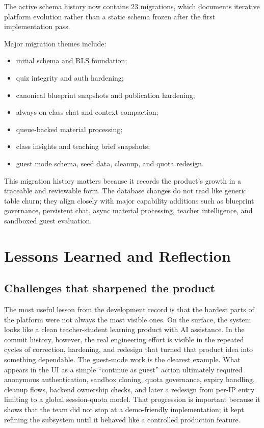 \documentclass[11pt,a4paper]{article}
\begin{document}
The active schema history now contains 23 migrations, which documents iterative platform evolution
rather than a static schema frozen after the first implementation pass.

Major migration themes include:
\begin{itemize}
  \item initial schema and RLS foundation;
  \item quiz integrity and auth hardening;
  \item canonical blueprint snapshots and publication hardening;
  \item always-on class chat and context compaction;
  \item queue-backed material processing;
  \item class insights and teaching brief snapshots;
  \item guest mode schema, seed data, cleanup, and quota redesign.
\end{itemize}

This migration history matters because it records the product's growth in a traceable and reviewable
form. The database changes do not read like generic table churn; they align closely with major
capability additions such as blueprint governance, persistent chat, async material processing,
teacher intelligence, and sandboxed guest evaluation.

\section{Lessons Learned and Reflection}

\subsection{Challenges that sharpened the product}

The most useful lesson from the development record is that the hardest parts of the platform were
not always the most visible ones. On the surface, the system looks like a clean teacher-student
learning product with AI assistance. In the commit history, however, the real engineering effort is
visible in the repeated cycles of correction, hardening, and redesign that turned that product idea
into something dependable. The guest-mode work is the clearest example. What appears in the UI as a
simple ``continue as guest'' action ultimately required anonymous authentication, sandbox cloning,
quota governance, expiry handling, cleanup flows, backend ownership checks, and later a redesign
from per-IP entry limiting to a global session-quota model. That progression is important because it
shows that the team did not stop at a demo-friendly implementation; it kept refining the subsystem
until it behaved like a controlled production feature.
\end{document}
